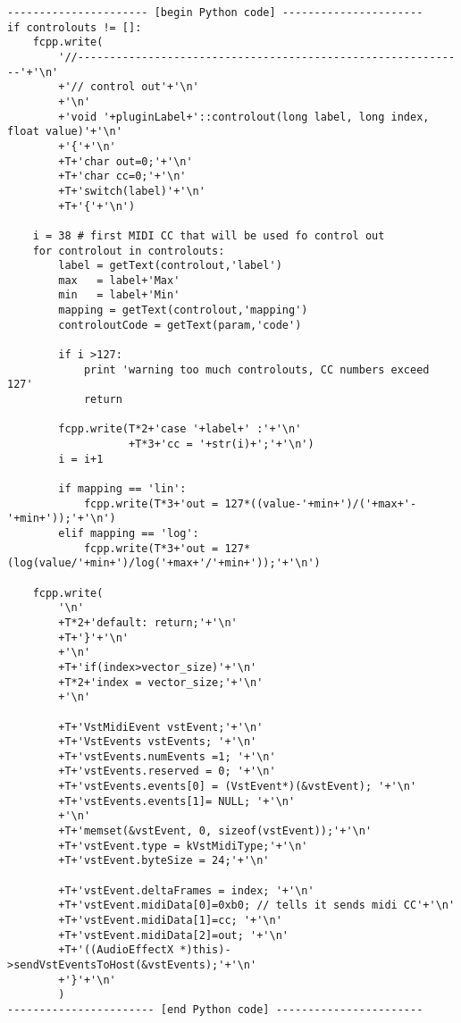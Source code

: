 \begin{verbatim}
---------------------- [begin Python code] ----------------------
if controlouts != []:
    fcpp.write(
        '//-------------------------------------------------------------'+'\n'
        +'// control out'+'\n'
        +'\n'
        +'void '+pluginLabel+'::controlout(long label, long index, float value)'+'\n'
        +'{'+'\n'
        +T+'char out=0;'+'\n'
        +T+'char cc=0;'+'\n'
        +T+'switch(label)'+'\n'
        +T+'{'+'\n')
    
    i = 38 # first MIDI CC that will be used fo control out
    for controlout in controlouts:
        label = getText(controlout,'label')
        max   = label+'Max'
        min   = label+'Min'
        mapping = getText(controlout,'mapping')
        controloutCode = getText(param,'code')
            
        if i >127:
            print 'warning too much controlouts, CC numbers exceed 127'
            return

        fcpp.write(T*2+'case '+label+' :'+'\n' 
                   +T*3+'cc = '+str(i)+';'+'\n')
        i = i+1
                        
        if mapping == 'lin':
            fcpp.write(T*3+'out = 127*((value-'+min+')/('+max+'-'+min+'));'+'\n')            
        elif mapping == 'log':
            fcpp.write(T*3+'out = 127*(log(value/'+min+')/log('+max+'/'+min+'));'+'\n')
                        
    fcpp.write(
        '\n'
        +T*2+'default: return;'+'\n'
        +T+'}'+'\n'
        +'\n'
        +T+'if(index>vector_size)'+'\n'
        +T*2+'index = vector_size;'+'\n'
        +'\n' 
        
        +T+'VstMidiEvent vstEvent;'+'\n'  
        +T+'VstEvents vstEvents; '+'\n' 
        +T+'vstEvents.numEvents =1; '+'\n' 
        +T+'vstEvents.reserved = 0; '+'\n' 
        +T+'vstEvents.events[0] = (VstEvent*)(&vstEvent); '+'\n' 
        +T+'vstEvents.events[1]= NULL; '+'\n'
        +'\n' 
        +T+'memset(&vstEvent, 0, sizeof(vstEvent));'+'\n' 
        +T+'vstEvent.type = kVstMidiType;'+'\n' 
        +T+'vstEvent.byteSize = 24;'+'\n' 
                
        +T+'vstEvent.deltaFrames = index; '+'\n' 
        +T+'vstEvent.midiData[0]=0xb0; // tells it sends midi CC'+'\n' 
        +T+'vstEvent.midiData[1]=cc; '+'\n' 
        +T+'vstEvent.midiData[2]=out; '+'\n' 
        +T+'((AudioEffectX *)this)->sendVstEventsToHost(&vstEvents);'+'\n' 
        +'}'+'\n'
        )
----------------------- [end Python code] -----------------------
\end{verbatim}

